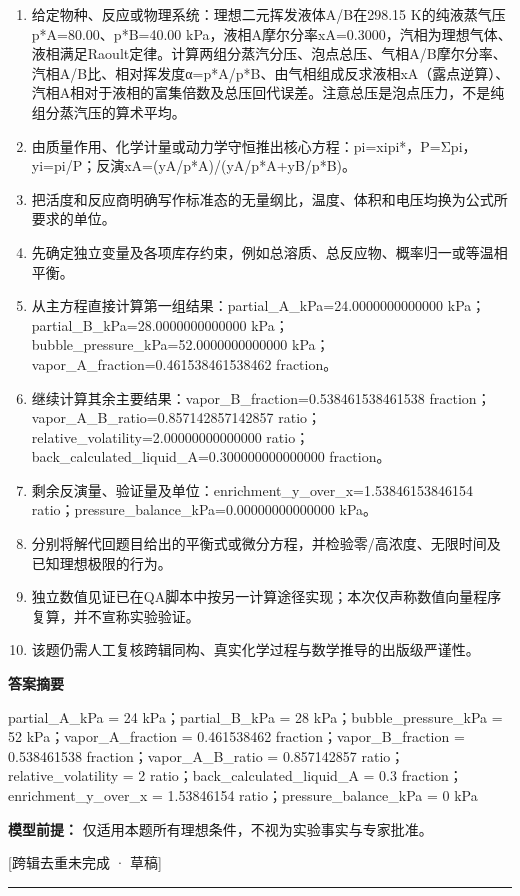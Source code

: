 \documentclass[UTF8,11pt,a4paper]{ctexart}
\begin{document}
\begin{enumerate}
\item 给定物种、反应或物理系统：理想二元挥发液体A/B在298.15 K的纯液蒸气压p*A=80.00、p*B=40.00 kPa，液相A摩尔分率xA=0.3000，汽相为理想气体、液相满足Raoult定律。计算两组分蒸汽分压、泡点总压、气相A/B摩尔分率、汽相A/B比、相对挥发度α=p*A/p*B、由气相组成反求液相xA（露点逆算）、汽相A相对于液相的富集倍数及总压回代误差。注意总压是泡点压力，不是纯组分蒸汽压的算术平均。
\item 由质量作用、化学计量或动力学守恒推出核心方程：pi=xipi*，P=Σpi，yi=pi/P；反演xA=(yA/p*A)/(yA/p*A+yB/p*B)。
\item 把活度和反应商明确写作标准态的无量纲比，温度、体积和电压均换为公式所要求的单位。
\item 先确定独立变量及各项库存约束，例如总溶质、总反应物、概率归一或等温相平衡。
\item 从主方程直接计算第一组结果：partial\_A\_kPa=24.0000000000000 kPa；partial\_B\_kPa=28.0000000000000 kPa；bubble\_pressure\_kPa=52.0000000000000 kPa；vapor\_A\_fraction=0.461538461538462 fraction。
\item 继续计算其余主要结果：vapor\_B\_fraction=0.538461538461538 fraction；vapor\_A\_B\_ratio=0.857142857142857 ratio；relative\_volatility=2.00000000000000 ratio；back\_calculated\_liquid\_A=0.300000000000000 fraction。
\item 剩余反演量、验证量及单位：enrichment\_y\_over\_x=1.53846153846154 ratio；pressure\_balance\_kPa=0.00000000000000 kPa。
\item 分别将解代回题目给出的平衡式或微分方程，并检验零/高浓度、无限时间及已知理想极限的行为。
\item 独立数值见证已在QA脚本中按另一计算途径实现；本次仅声称数值向量程序复算，并不宣称实验验证。
\item 该题仍需人工复核跨辑同构、真实化学过程与数学推导的出版级严谨性。
\end{enumerate}
\noindent\textbf{答案摘要}\par
partial\_A\_kPa = 24 kPa；partial\_B\_kPa = 28 kPa；bubble\_pressure\_kPa = 52 kPa；vapor\_A\_fraction = 0.461538462 fraction；vapor\_B\_fraction = 0.538461538 fraction；vapor\_A\_B\_ratio = 0.857142857 ratio；relative\_volatility = 2 ratio；back\_calculated\_liquid\_A = 0.3 fraction；enrichment\_y\_over\_x = 1.53846154 ratio；pressure\_balance\_kPa = 0 kPa\par
\noindent\textbf{模型前提：}
仅适用本题所有理想条件，不视为实验事实与专家批准。\par
\noindent\textcolor{red!65!black}{[跨辑去重未完成 · 草稿]} \par
\medskip\hrule\medskip
{}
\end{document}
